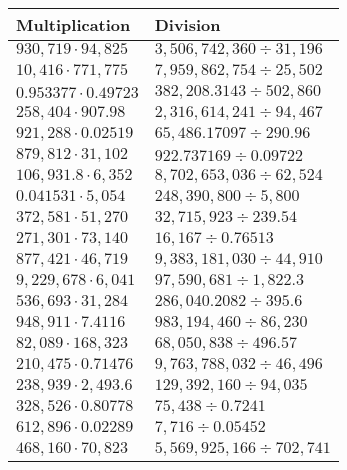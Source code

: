 \begin{longtable}[]{@{}ll@{}}
\toprule
Multiplication & Division\tabularnewline
\midrule
\endhead
\(930,719\cdot94,825\) & \(3,506,742,360÷31,196\)\tabularnewline
\(10,416\cdot771,775\) & \(7,959,862,754÷25,502\)\tabularnewline
\(0.953377\cdot0.49723\) & \(382,208.3143÷502,860\)\tabularnewline
\(258,404\cdot907.98\) & \(2,316,614,241÷94,467\)\tabularnewline
\(921,288\cdot0.02519\) & \(65,486.17097÷290.96\)\tabularnewline
\(879,812\cdot31,102\) & \(922.737169÷0.09722\)\tabularnewline
\(106,931.8\cdot6,352\) & \(8,702,653,036÷62,524\)\tabularnewline
\(0.041531\cdot5,054\) & \(248,390,800÷5,800\)\tabularnewline
\(372,581\cdot51,270\) & \(32,715,923÷239.54\)\tabularnewline
\(271,301\cdot73,140\) & \(16,167÷0.76513\)\tabularnewline
\(877,421\cdot46,719\) & \(9,383,181,030÷44,910\)\tabularnewline
\(9,229,678\cdot6,041\) & \(97,590,681÷1,822.3\)\tabularnewline
\(536,693\cdot31,284\) & \(286,040.2082÷395.6\)\tabularnewline
\(948,911\cdot7.4116\) & \(983,194,460÷86,230\)\tabularnewline
\(82,089\cdot168,323\) & \(68,050,838 ÷496.57\)\tabularnewline
\(210,475\cdot0.71476\) & \(9,763,788,032÷46,496\)\tabularnewline
\(238,939\cdot2,493.6\) & \(129,392,160÷94,035\)\tabularnewline
\(328,526\cdot0.80778\) & \(75,438÷0.7241\)\tabularnewline
\(612,896\cdot0.02289\) & \(7,716÷0.05452\)\tabularnewline
\(468,160\cdot70,823\) & \(5,569,925,166÷702,741\)\tabularnewline
\bottomrule
\end{longtable}
